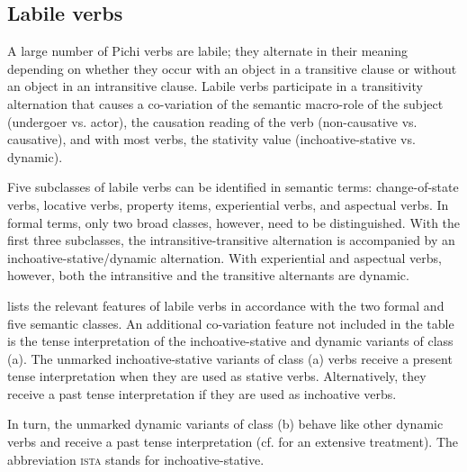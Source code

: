 \subsection{Labile verbs} \label{sec:9.2.3}

A large number of Pichi verbs are labile; they alternate in their meaning depending on whether they occur with an object in a transitive clause or without an object in an intransitive clause. Labile verbs participate in a transitivity alternation that causes a co-variation of the semantic macro-role of the subject (undergoer vs. actor), the causation reading of the verb (non-causative vs. causative), and with most verbs, the stativity value (inchoative-stative vs. dynamic).


Five subclasses of labile verbs can be identified in semantic terms: change-of-state verbs, locative verbs, property items, experiential verbs, and aspectual verbs. In formal terms, only two broad classes, however, need to be distinguished. With the first three subclasses, the intransitive-transitive alternation is accompanied by an inchoative-stative/dynamic alternation. With experiential and aspectual verbs, however, both the intransitive and the transitive alternants are dynamic. 


 lists the relevant features of labile verbs in accordance with the two formal and five semantic classes. An additional co-variation feature not included in the table is the tense interpretation of the inchoative-stative and dynamic variants of class (a). The unmarked inchoative-stative variants of class (a) verbs receive a present tense interpretation when they are used as stative verbs. Alternatively, they receive a past tense interpretation if they are used as inchoative verbs.

In turn, the unmarked dynamic variants of class (b) behave like other dynamic verbs and receive a past tense interpretation (cf.  for an extensive treatment). The abbreviation \textsc{ista} stands for inchoative-stative. 


